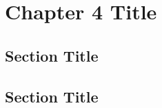 \documentclass[../main.tex]{subfiles}
\begin{document}
\newpage
\doublespacing
\setcounter{chapter}{3}
\thesischapterstyle
\thispagestyle{empty}

\chapter{Chapter 4 Title}\label{chap4:short-label}

\section{Section Title}
\lipsum[1]

\section{Section Title}
\lipsum[2]
\end{document}
